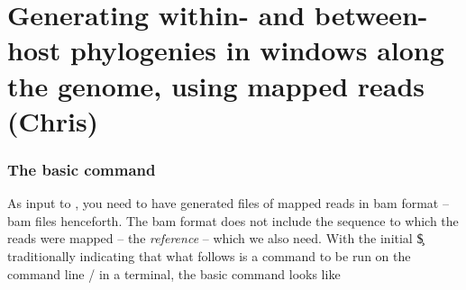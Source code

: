 \part{Generating within- and between-host phylogenies in windows along the genome, using mapped reads (Chris)}

\section{The basic command}

As input to \p, you need to have generated files of mapped reads in bam format -- bam files henceforth.
The bam format does not include the sequence to which the reads were mapped -- the {\it reference} -- which we also need.
With the initial \c{\$} traditionally indicating that what follows is a command to be run on the command line / in a terminal, the basic \p command looks like

